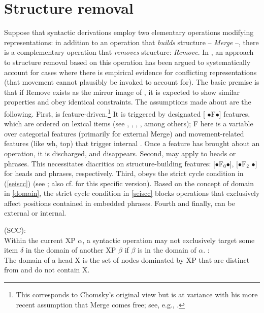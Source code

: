 \documentclass[output=paper]{langsci/langscibook}
\begin{document}
\section{Structure removal}\label{sec:32.3}

Suppose that syntactic derivations employ two elementary operations modifying
representations: in addition to an operation that {\itshape builds} structure --
{\itshape Merge} \parencite{Chomsky2001,Chomsky2008,Chomsky2013} --, there is a
complementary operation that {\itshape removes} structure: {\itshape Remove}. In
\citet{Mueller:16:sho,Mueller:17:fdm,Mueller:17:pre}, an approach to structure
removal based on this operation has been argued to systematically account for
cases where there is empirical evidence for conflicting representations (that
movement cannot plausibly be invoked to account for). The basic premise is that
if Remove exists as the mirror image of , it is expected to show
similar properties and obey identical constraints. The assumptions made about
 are the following. First,  is
feature-driven.\footnote{This corresponds to Chomsky's original view but is at
    variance with his more recent assumption that Merge comes free; see, e.g.,
    \textcite{Chomsky2013}.} It is triggered by designated [{\small
    $\bullet$}F{\small $\bullet$}] features, which are ordered on lexical items
(see \citealt{Heck&Mueller:07:elow}, \citealt{Abels2012}, \citealt{Stabler:14},
\citealt{Georgi:14}, among others); F here is a variable over categorial
features (primarily for external Merge) and movement-related features (like wh,
top) that trigger internal .  Once a feature has brought about an
operation, it is discharged, and disappears.  Second,  may apply to
heads or phrases. This necessitates diacritics on structure-building features:
[{\small $\bullet$}F$_0${\small $\bullet$}], [{\small $\bullet$}F$_2${\small
$\bullet$}] for heads and phrases, respectively.  Third,  obeys the
strict cycle condition in (\ref{seiscc}) (see
\citealt{Chomsky1973,Chomsky1995,Chomsky2001,Chomsky2008}; also cf.
\citealt{Safir:10,Safir:15} for this specific version). Based on the concept of
domain in \eqref{domain}, the strict cycle condition in \eqref{seiscc} blocks
operations that exclusively affect positions contained in embedded phrases.
Fourth and finally,  can be external or internal.

 (SCC):\\ Within \label{scc}the
current XP $\alpha$, a syntactic operation may not exclusively target some
item $\delta$ in the domain of another XP $\beta$ if $\beta$ is in the domain
of $\alpha$.
 \parencite{Chomsky1995}:\\ The domain of a head X
is the set of nodes dominated by XP that are distinct from and do not contain
X.
\z
\end{document}
